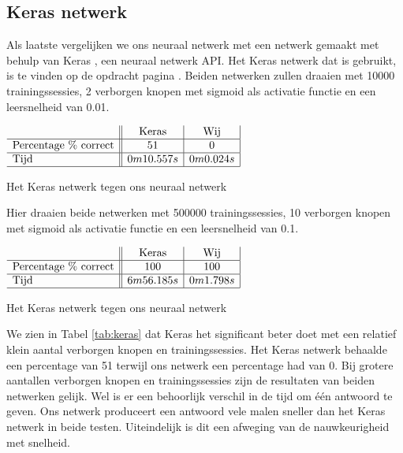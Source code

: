 \subsection{Keras netwerk}
Als laatste vergelijken we ons neuraal netwerk met een netwerk gemaakt met behulp van Keras \cite{keras}, een neuraal netwerk API. Het Keras netwerk dat is gebruikt, is te vinden op de opdracht pagina \cite{assignment}. 
Beiden netwerken zullen draaien met 10000 trainingssessies, 2 verborgen knopen met sigmoid als activatie functie en een leersnelheid van 0.01.

\begin{table}[ht]
    \centering
      $\begin{array}{l || c | c | c}
                                     & \text{Keras} & \text{Wij} \\ \hline
        \text{Percentage \% correct} & 51 & 0 \\ \hline
        \text{Tijd}      & 0m10.557s & 0m0.024s \\ \hline
      \end{array}$
    \caption{Het Keras netwerk tegen ons neuraal netwerk}
    \label{tab:keras}
\end{table}

Hier draaien beide netwerken met 500000 trainingssessies, 10 verborgen knopen met sigmoid als activatie functie en een leersnelheid van 0.1.

\begin{table}[ht]
    \centering
      $\begin{array}{l || c |  c | c}
                                     & \text{Keras} & \text{Wij} \\ \hline
        \text{Percentage \% correct} & 100 & 100 \\ \hline
        \text{Tijd}      & 6m56.185s & 0m1.798s  \\ \hline
      \end{array}$
    \caption{Het Keras netwerk tegen ons neuraal netwerk}
    \label{tab:keras}
\end{table}

We zien in Tabel \ref{tab:keras} dat Keras het significant beter doet met een relatief klein aantal verborgen knopen en trainingssessies. Het Keras netwerk behaalde een percentage van 51 terwijl ons netwerk een percentage had van 0. Bij grotere aantallen verborgen knopen en trainingssessies zijn de resultaten van beiden netwerken gelijk. Wel is er een behoorlijk verschil in de tijd om \'e\'en antwoord te geven. Ons netwerk produceert een antwoord vele malen sneller dan het Keras netwerk in beide testen. Uiteindelijk is dit een afweging van de nauwkeurigheid met snelheid. 